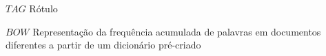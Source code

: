 \begin{basedescript}{\desclabelstyle{\pushlabel}\desclabelwidth{6em}}
\item[$TAG$] Rótulo%
\item[$BOW$] Representação da frequência acumulada de palavras em documentos
diferentes a partir de um dicionário pré-­criado%

\end{basedescript}